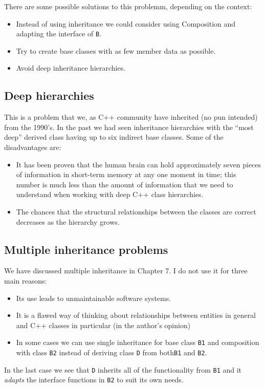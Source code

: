 There are some possible solutions to this problemm, depending on the context:
\begin{itemize}
	\item Instead of using inheritance we could consider using Composition and adapting the interface of \texttt{B}.
	\item Try to create base classes with as few member data as possible.
	\item Avoid deep inheritance hierarchies.
\end{itemize}

\subsection{Deep hierarchies}

This is a problem that we, as C++ community have inherited (no pun intended) from the 1990's. In the past we had seen inheritance hierarchies with the ``most deep'' derived class having up to six indirect base classes. Some of the disadvantages are:
\begin{itemize}
	\item It has been proven that the human brain can hold approximately seven pieces of information in short-term memory at any one moment in time; this number is much less than the amount of information that we need to understand when working with deep C++ class hierarchies.
	\item The chances that the structural relationships between the classes are correct decreases as the hierarchy grows.
\end{itemize}

\subsection{Multiple inheritance problems}

We have discussed multiple inheritance in Chapter $7$. I do not use it for three main reasons:
\begin{itemize}
	\item Its use leads to unmaintainable software systems.
	\item It is a flawed way of thinking about relationships between entities in general and C++ classes in particular (in the author's opinion)
	\item In some cases we can use single inheritance for base class \texttt{B1} and composition with class \texttt{B2} instead of deriving class \texttt{D} from both\texttt{B1} and \texttt{B2}.
\end{itemize}
In the last case we see that \texttt{D} inherits all of the functionality from \texttt{B1} and it \emph{adapts} the interface functions in \texttt{B2} to suit its own needs.

